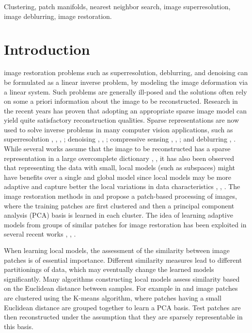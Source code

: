 \documentclass[journal]{IEEEtran}
\begin{document}
\begin{IEEEkeywords}
Clustering, patch manifolds, nearest neighbor search, image superresolution, image deblurring, image restoration.
\end{IEEEkeywords}
\IEEEpeerreviewmaketitle
\section{Introduction}
\label{sec:introduction}


 image restoration problems such as superresolution, deblurring, and denoising can be formulated as a linear inverse problem, by modeling the image deformation via a linear system. Such problems are generally ill-posed and the solutions often rely on some a priori information about the image to be reconstructed. Research in the recent years has proven that adopting an appropriate sparse image model can yield quite satisfactory reconstruction qualities. 
Sparse representations are now used to solve inverse problems in many computer vision applications, such as superresolution \cite{Dong13nonlocally}, \cite{Dong11image}, \cite{Yang08image}, \cite{Yang10image}; denoising  \cite{Dong13nonlocally}, \cite{Elad06image}, \cite{Dong11sparsity}; compressive sensing \cite{Donoho06compressed}, \cite{Candes06near}, \cite{Candes06robust}; and deblurring \cite{Dong13nonlocally}, \cite{Dong11image}. While several works assume that the image to be reconstructed has a sparse representation in a large overcomplete dictionary \cite{Yang10image}, \cite{Elad06image}, it has also been observed that representing the data with small, local models (such as subspaces) might have benefits over a single and global model since local models may be more adaptive and capture better the local variations in data characteristics \cite{Dong13nonlocally}, \cite{Dong11image}, \cite{Ni11example}. The image restoration methods in \cite{Dong13nonlocally} and \cite{Dong11image} propose a patch-based processing of images, where the training patches are first clustered and then a principal component analysis (PCA) basis is learned in each cluster. 
The idea of learning adaptive models from groups of similar patches for image restoration has been exploited in several recent works \cite{Salmon14poisson}, \cite{Dabov09bm3d}, \cite{Danielyan10denoising}.

When learning local models, the assessment of the similarity between image patches is of essential importance. Different similarity measures lead to different partitionings of data, which may eventually change the learned models significantly. Many algorithms constructing local models assess similarity based on the Euclidean distance between samples. For example in \cite{Dong13nonlocally} and  \cite{Dong11image} image patches are clustered using the K-means algorithm, where patches having a small Euclidean distance are grouped together to learn a PCA basis. Test patches are then reconstructed under the assumption that they are sparsely representable in this basis. 
\end{document}
